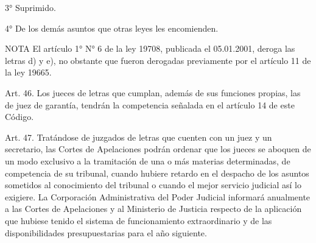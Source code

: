     3° Suprimido.

    4° De los demás asuntos que otras leyes les encomienden.




NOTA
      El artículo 1° N° 6 de la ley 19708, publicada el 05.01.2001, deroga las letras d) y e), no obstante que fueron derogadas previamente por el artículo 11 de la ley 19665.

    Art. 46. Los jueces de letras que cumplan, además de sus funciones propias, las de juez de garantía, tendrán la competencia señalada en el artículo 14 de este Código.

    Art. 47. Tratándose de juzgados de letras que cuenten con un juez y un secretario, las Cortes de Apelaciones podrán ordenar que los jueces se aboquen de un modo exclusivo a la tramitación de una o más materias determinadas, de competencia de su tribunal, cuando hubiere retardo en el despacho de los asuntos sometidos al conocimiento del tribunal o cuando el mejor servicio judicial así lo exigiere.
    La Corporación Administrativa del Poder Judicial informará anualmente a las Cortes de Apelaciones y al Ministerio de Justicia respecto de la aplicación que hubiese tenido el sistema de funcionamiento extraordinario y de las disponibilidades presupuestarias para el año siguiente.

